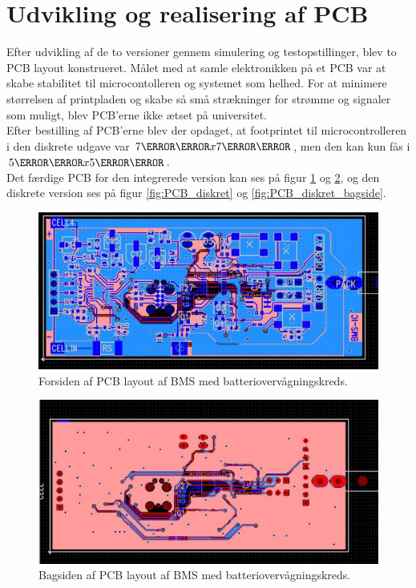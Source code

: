 \section{Udvikling og realisering af PCB}
Efter udvikling af de to versioner gennem simulering og testopstillinger, blev to PCB layout konstrueret. Målet med at samle elektronikken på et PCB var at skabe stabilitet til microcontolleren og systemet som helhed. For at minimere størrelsen af printpladen og skabe så små strækninger for strømme og signaler som muligt, blev PCB'erne ikke ætset på universitet.
\\

Efter bestilling af PCB'erne blev der opdaget, at footprintet til microcontrolleren i den diskrete udgave var $7\milli\meter x 7\milli\meter$, men den kan kun fås i $5\milli\meter x 5\milli\meter$.
\\

Det færdige PCB for den integrerede version kan ses på figur \ref{fig:PCB_IC} og \ref{fig:PCB_IC_bagside}, og den diskrete version ses på figur \ref{fig:PCB_diskret} og \ref{fig:PCB_diskret_bagside}.

\begin{figure}[h]
	\centering
	\includegraphics[width=15cm]{billeder/IC_1.jpg}
	\caption{Forsiden af PCB layout af BMS med batteriovervågningskreds.}
	\label{fig:PCB_IC}
\end{figure}

\begin{figure}[h]
	\centering
	\includegraphics[width=15cm]{billeder/IC_2.jpg}
	\caption{Bagsiden af PCB layout af BMS med batteriovervågningskreds.}
	\label{fig:PCB_IC_bagside}
\end{figure}

